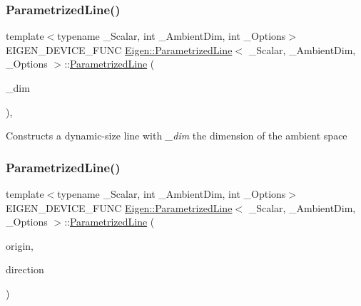 \subsubsection{\texorpdfstring{ParametrizedLine()}{ParametrizedLine()}\hspace{0.1cm}{\footnotesize\ttfamily [2/5]}}
{\footnotesize\ttfamily template$<$typename \+\_\+\+Scalar, int \+\_\+\+Ambient\+Dim, int \+\_\+\+Options$>$ \\
E\+I\+G\+E\+N\+\_\+\+D\+E\+V\+I\+C\+E\+\_\+\+F\+U\+NC \mbox{\hyperlink{class_eigen_1_1_parametrized_line}{Eigen\+::\+Parametrized\+Line}}$<$ \+\_\+\+Scalar, \+\_\+\+Ambient\+Dim, \+\_\+\+Options $>$\+::\mbox{\hyperlink{class_eigen_1_1_parametrized_line}{Parametrized\+Line}} (\begin{DoxyParamCaption}\item[{\mbox{\hyperlink{class_eigen_1_1_parametrized_line_a3c9f84dd8608940282b16652a296c764}{Index}}}]{\+\_\+dim }\end{DoxyParamCaption})\hspace{0.3cm}{\ttfamily [inline]}, {\ttfamily [explicit]}}

Constructs a dynamic-\/size line with {\itshape \+\_\+dim} the dimension of the ambient space \mbox{\label{class_eigen_1_1_parametrized_line_a1b1d3ff9dee6f252f14bc2d8f3f0bb02}} 
\subsubsection{\texorpdfstring{ParametrizedLine()}{ParametrizedLine()}\hspace{0.1cm}{\footnotesize\ttfamily [3/5]}}
{\footnotesize\ttfamily template$<$typename \+\_\+\+Scalar, int \+\_\+\+Ambient\+Dim, int \+\_\+\+Options$>$ \\
E\+I\+G\+E\+N\+\_\+\+D\+E\+V\+I\+C\+E\+\_\+\+F\+U\+NC \mbox{\hyperlink{class_eigen_1_1_parametrized_line}{Eigen\+::\+Parametrized\+Line}}$<$ \+\_\+\+Scalar, \+\_\+\+Ambient\+Dim, \+\_\+\+Options $>$\+::\mbox{\hyperlink{class_eigen_1_1_parametrized_line}{Parametrized\+Line}} (\begin{DoxyParamCaption}\item[{const \mbox{\hyperlink{class_eigen_1_1_matrix}{Vector\+Type}} \&}]{origin,  }\item[{const \mbox{\hyperlink{class_eigen_1_1_matrix}{Vector\+Type}} \&}]{direction }\end{DoxyParamCaption})\hspace{0.3cm}{\ttfamily [inline]}}

